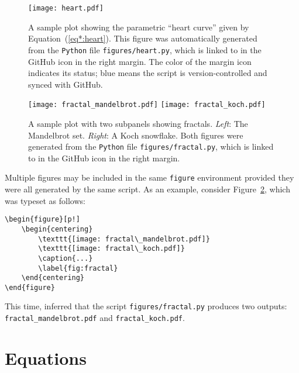 \documentclass[modern]{aastex62}
\begin{document}
\begin{figure}[p!]
    \begin{centering}
        \texttt{[image: heart.pdf]}
        \caption{
            A sample plot showing the parametric ``heart curve'' given by Equation~(\ref{eq*:heart}).
            This figure was automatically generated from the \texttt{Python} file \texttt{figures/heart.py}, which is linked to in the GitHub icon in the right margin.
            The color of the margin icon indicates its status; blue means the script is version-controlled and synced with GitHub.
        }
        \label{fig:heart}
    \end{centering}
\end{figure}
%
\begin{figure}[p!]
    \begin{centering}
        \texttt{[image: fractal\_mandelbrot.pdf]}
        \texttt{[image: fractal\_koch.pdf]}
        \caption{
            A sample plot with two subpanels showing fractals. \emph{Left}: The Mandelbrot set. \emph{Right}: A Koch snowflake. Both figures were generated from the \texttt{Python} file \texttt{figures/fractal.py}, which is linked to in the GitHub icon in the right margin.
        }
        \label{fig:fractal}
    \end{centering}
\end{figure}

Multiple figures may be included in the same \lstinline[style=LaTeX]!figure! environment provided they were all generated by the same script. As an example, consider Figure~\ref{fig:fractal}, which was typeset as follows:
%
\begin{lstlisting}[style=LaTeX]
\begin{figure}[p!]
    \begin{centering}
        \texttt{[image: fractal\_mandelbrot.pdf]}
        \texttt{[image: fractal\_koch.pdf]}
        \caption{...}
        \label{fig:fractal}
    \end{centering}
\end{figure}
\end{lstlisting}
%
This time, \showyourwork inferred that the script \texttt{figures/fractal.py} produces two outputs: \texttt{fractal\_mandelbrot.pdf} and
\texttt{fractal\_koch.pdf}.


\section{Equations}
\end{document}
